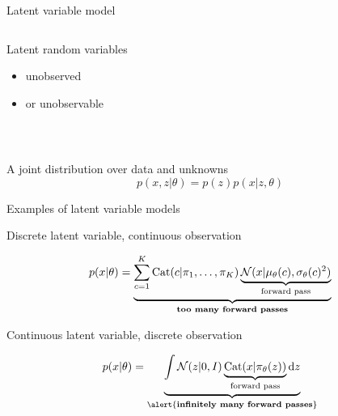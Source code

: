 \begin{frame}{Latent variable model}

\begin{columns}
\begin{column}{0.6\textwidth}
Latent random variables
\begin{itemize}
	\item unobserved 
	\item or unobservable
\end{itemize}
\end{column}
\begin{column}{0.2\textwidth}

\end{column}
\end{columns}

~ \pause


A joint distribution over data and unknowns
\begin{equation*}
p(x, z|\theta) =  p(z) p(x|z, \theta)
\end{equation*}

\end{frame}


\begin{frame}{Examples of latent variable models}

Discrete latent variable, continuous observation
	\begin{small}
	\begin{equation*}
	p(x|\theta) = \underbrace{\sum_{c=1}^K \operatorname{Cat}(c|\pi_1, \ldots, \pi_K) \underbrace{\mathcal N(x|\mu_\theta(c), \sigma_\theta(c)^2)}_{\text{forward pass}}}_{\text{{\bf too many forward passes}}}
	\end{equation*}
	\end{small} 

	\pause
	
Continuous latent variable, discrete observation
	\begin{small}
	\begin{equation*}
	p(x|\theta) = \underbrace{\int \mathcal N(z|0, I) \underbrace{\Cat(x|\pi_\theta(z))}_{\text{forward pass}} \mathrm{d}z }_{\text{\alert{{\bf infinitely many forward passes}}}}
	\end{equation*}
	\end{small}

\end{frame}

